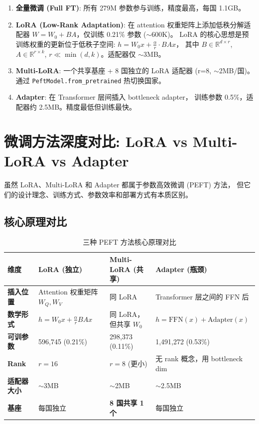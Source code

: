 \documentclass[11pt,a4paper]{article}
\begin{document}
\begin{enumerate}[itemsep=3pt]
\item \textbf{全量微调 (Full FT)}: 所有 279M 参数参与训练，精度最高，每国 1.1GB。
\item \textbf{LoRA (Low-Rank Adaptation)}:
在 attention 权重矩阵上添加低秩分解适配器 $W = W_0 + BA$，仅训练 0.21\% 参数 ($\sim$600K)。
LoRA 的核心思想是预训练权重的更新位于低秩子空间:
$h = W_0 x + \frac{\alpha}{r} \cdot BA x$，
其中 $B \in \mathbb{R}^{d \times r}$, $A \in \mathbb{R}^{r \times k}$,
$r \ll \min(d,k)$。适配器仅 $\sim$3MB。
\item \textbf{Multi-LoRA}: 一个共享基座 + 8 国独立的 LoRA 适配器 (r=8, $\sim$2MB/国)。
通过 \texttt{PeftModel.from\_pretrained} 热切换国家。
\item \textbf{Adapter}: 在 Transformer 层间插入 bottleneck adapter，
训练参数 0.5\%，适配器约 2.5MB。精度最低但训练最快。
\end{enumerate}

\section{微调方法深度对比: LoRA vs Multi-LoRA vs Adapter}

虽然 LoRA、Multi-LoRA 和 Adapter 都属于参数高效微调 (PEFT) 方法，
但它们的设计理念、训练方式、参数效率和部署方式有本质区别。

\subsection{核心原理对比}

\begin{table}[h]\centering
\caption{三种 PEFT 方法核心原理对比}
\begin{tabular}{@{}lp{4cm}p{4cm}p{4cm}@{}}\toprule
\textbf{维度} & \textbf{LoRA (独立)} & \textbf{Multi-LoRA (共享)} & \textbf{Adapter (瓶颈)} \\\midrule
\textbf{插入位置} & Attention 权重矩阵 $W_Q, W_V$ & 同 LoRA & Transformer 层之间的 FFN 后 \\
\textbf{数学形式} & $h=W_0x + \frac{\alpha}{r}BAx$ & 同 LoRA，但共享 $W_0$ & $h=\text{FFN}(x) + \text{Adapter}(x)$ \\
\textbf{可训参数} & 596,745 (0.21\%) & 298,373 (0.11\%) & 1,491,272 (0.53\%) \\
\textbf{Rank} & $r=16$ & $r=8$ (更小) & 无 rank 概念，用 bottleneck dim \\
\textbf{适配器大小} & $\sim$3MB & $\sim$2MB & $\sim$2.5MB \\
\textbf{基座} & 每国独立 & \textbf{8 国共享 1 个} & 每国独立 \\
\bottomrule
\end{tabular}
\end{table}
\end{document}
